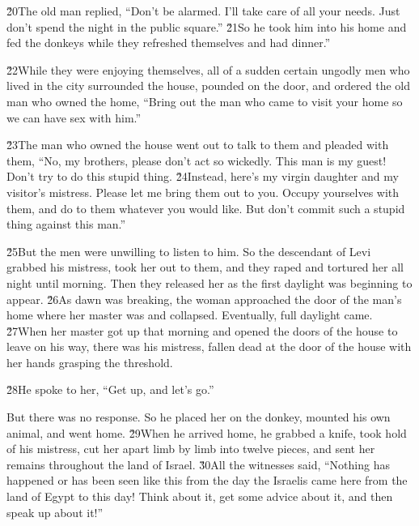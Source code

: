 \v{20}The old man replied, ``Don't be alarmed. I'll take care of all your needs. Just don't spend the night in the public square.'' \v{21}So he took him into his home and fed the donkeys while they refreshed themselves and had dinner.''

\v{22}While they were enjoying themselves, all of a sudden certain ungodly men who lived in the city surrounded the house, pounded on the door, and ordered the old man who owned the home, ``Bring out the man who came to visit your home so we can have sex with him.''

\v{23}The man who owned the house went out to talk to them and pleaded with them, ``No, my brothers, please don't act so wickedly. This man is my guest! Don't try to do this stupid thing. \v{24}Instead, here's my virgin daughter and my visitor's mistress. Please let me bring them out to you. Occupy yourselves with them, and do to them whatever you would like. But don't commit such a stupid thing against this man.''

\v{25}But the men were unwilling to listen to him. So the descendant of Levi grabbed his mistress, took her out to them, and they raped and tortured her all night until morning. Then they released her as the first daylight was beginning to appear. \v{26}As dawn was breaking, the woman approached the door of the man's home where her master was and collapsed. Eventually, full daylight came. \v{27}When her master got up that morning and opened the doors of the house to leave on his way, there was his mistress, fallen dead at the door of the house with her hands grasping the threshold.

\v{28}He spoke to her, ``Get up, and let's go.''

But there was no response. So he placed her on the donkey, mounted his own animal, and went home. \v{29}When he arrived home, he grabbed a knife, took hold of his mistress, cut her apart limb by limb into twelve pieces, and sent her remains throughout the land of Israel. \v{30}All the witnesses said, ``Nothing has happened or has been seen like this from the day the Israelis came here from the land of Egypt to this day! Think about it, get some advice about it, and then speak up about it!''

